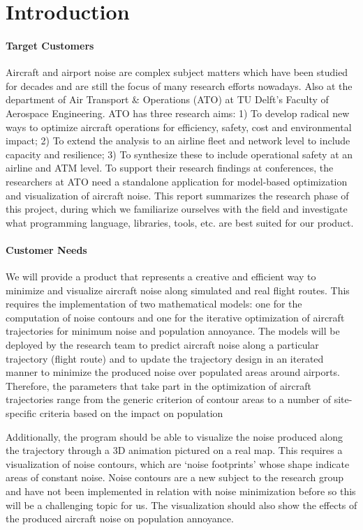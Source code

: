 \section{Introduction}

\paragraph{Target Customers}
Aircraft and airport noise are complex subject matters which have been studied for decades and are still the focus of many research efforts nowadays. Also at the department of Air Transport \& Operations (ATO) at TU Delft’s Faculty of Aerospace Engineering. ATO has three research aims: 1) To develop radical new ways to optimize aircraft operations for efficiency, safety, cost and environmental impact; 2) To extend the analysis to an airline fleet and network level to include capacity and resilience; 3) To synthesize these to include operational safety at an airline and ATM level. To support their research findings at conferences, the researchers at ATO need a standalone application for model-based optimization and visualization of aircraft noise. This report summarizes the research phase of this project, during which we familiarize ourselves with the field and investigate what programming language, libraries, tools, etc. are best suited for our product.

\paragraph{Customer Needs}
We will provide a product that represents a creative and efficient way to minimize and visualize aircraft noise along simulated and real flight routes. This requires the implementation of two mathematical models: one for the computation of noise contours and one for the iterative optimization of aircraft trajectories for minimum noise and population annoyance. The models will be deployed by the research team to predict aircraft noise along a particular trajectory (flight route) and to update the trajectory design in an iterated manner to minimize the produced noise over populated areas around airports. Therefore, the parameters that take part in the optimization of aircraft trajectories range from the generic criterion of contour areas to a number of site-specific criteria based on the impact on population

Additionally, the program should be able to visualize the noise produced along the trajectory through a 3D animation pictured on a real map. This requires a visualization of noise contours, which are ‘noise footprints’ whose shape indicate areas of constant noise. Noise contours are a new subject to the research group and have not been implemented in relation with noise minimization before so this will be a challenging topic for us. The visualization should also show the effects of the produced aircraft noise on population annoyance.


